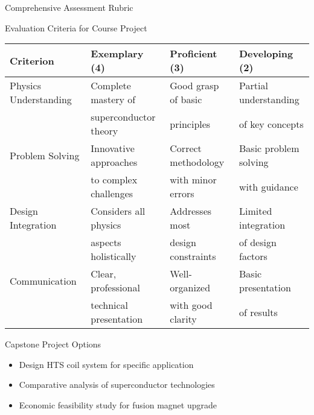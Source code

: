 \begin{frame}{Comprehensive Assessment Rubric}
    \begin{block}{Evaluation Criteria for Course Project}
        \small
        \begin{tabular}{|l|l|l|l|}
        \hline
        \textbf{Criterion} & \textbf{Exemplary (4)} & \textbf{Proficient (3)} & \textbf{Developing (2)} \\
        \hline
        Physics Understanding & Complete mastery of & Good grasp of basic & Partial understanding \\
        & superconductor theory & principles & of key concepts \\
        \hline
        Problem Solving & Innovative approaches & Correct methodology & Basic problem solving \\
        & to complex challenges & with minor errors & with guidance \\
        \hline
        Design Integration & Considers all physics & Addresses most & Limited integration \\
        & aspects holistically & design constraints & of design factors \\
        \hline
        Communication & Clear, professional & Well-organized & Basic presentation \\
        & technical presentation & with good clarity & of results \\
        \hline
        \end{tabular}
    \end{block}
    
    \begin{alertblock}{Capstone Project Options}
        \begin{itemize}
            \item Design HTS coil system for specific application
            \item Comparative analysis of superconductor technologies
            \item Economic feasibility study for fusion magnet upgrade
        \end{itemize}
    \end{alertblock}
\end{frame}

